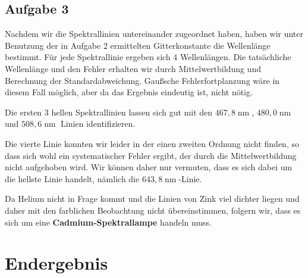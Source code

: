 \documentclass[a4paper,german,12pt,smallheadings]{scrartcl}
\begin{document}
\subsection{Aufgabe 3}

Nachdem wir die Spektrallinien untereinander zugeordnet haben, haben wir unter
Benutzung der in Aufgabe 2 ermittelten Gitterkonstante die Wellenlänge
bestimmt. Für jede Spektrallinie ergeben sich 4 Wellenlängen. Die tatsächliche
Wellenlänge und den Fehler erhalten wir durch Mittelwertbildung und Berechnung
der Standardabweichung. Gaußsche Fehlerfortplanzung wäre in diesem Fall
möglich, aber da das Ergebnis eindeutig ist, nicht nötig.

Die ersten 3 hellen Spektrallinien lassen sich gut mit den $467{,}8
\operatorname{nm}$, $480{,}0 \operatorname{nm}$ und $508{,}6 \operatorname{nm}$
Linien identifizieren.

Die vierte Linie konnten wir leider in der einen zweiten Ordnung nicht finden,
so dass sich wohl ein systematischer Fehler ergibt, der durch die
Mittelwertbildung nicht aufgehoben wird. Wir können daher nur vermuten, dass es
sich dabei um die hellste Linie handelt, nämlich die $643{,}8
\operatorname{nm}$-Linie.

Da Helium nicht in Frage kommt und die Linien von Zink viel dichter liegen und
daher mit den farblichen Beobachtung nicht übereinstimmen, folgern wir, dass es
sich um eine \textbf{Cadmium-Spektrallampe} handeln muss.

\section{Endergebnis}
\end{document}
